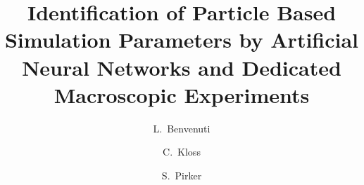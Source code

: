 
\title{Identification of Particle Based Simulation Parameters by Artificial Neural Networks and Dedicated Macroscopic Experiments}


\author[jku]{L.~Benvenuti}

\author[dcs]{C.~Kloss}

\author[jku]{S.~Pirker}


\address[jku]{Johannes Kepler University Linz, Department on Particulate Flow
Modelling, Altenbergerstrasse 69, 4040, Linz, Austria}

\address[dcs]{DCS Computing GmbH, Altenbergerstr. 66a - Science Park, 4040 Linz,
Austria}
